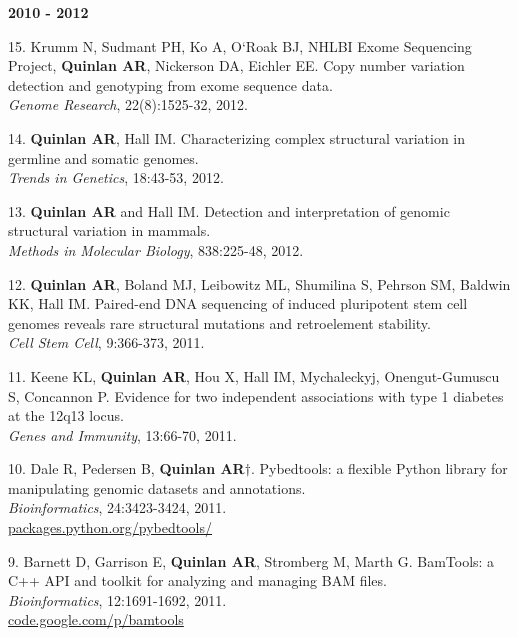 \documentclass[margin,line]{cv}
\begin{document}
\begin{resume}
\begin{list}{*}{}
    \end{list}

    \textbf{2010 - 2012} \\
    \begin{list}{*}{}

    \item[15.] Krumm N, Sudmant PH, Ko A, O`Roak BJ, NHLBI Exome Sequencing Project,
    \textbf{Quinlan AR}, Nickerson DA, Eichler EE.
    Copy number variation detection and genotyping from exome sequence data.\\
    \textit{Genome Research}, 22(8):1525-32, 2012.

    \item[14.] \textbf{Quinlan AR}, Hall IM.
    Characterizing complex structural variation in germline and somatic genomes.\\
    \textit{Trends in Genetics}, 18:43-53, 2012.

    \item[13.] \textbf{Quinlan AR} and Hall IM.
    Detection and interpretation of genomic structural variation in mammals.\\
    \textit{Methods in Molecular Biology}, 838:225-48, 2012.

    \item[12.] \textbf{Quinlan AR}, Boland MJ, Leibowitz ML, Shumilina S, Pehrson SM, Baldwin KK, Hall IM.
    Paired-end DNA sequencing of induced pluripotent stem cell genomes reveals
    rare structural mutations and retroelement stability.\\
    \textit{Cell Stem Cell}, 9:366-373, 2011.

    \item[11.] Keene KL, \textbf{Quinlan AR}, Hou X, Hall IM, Mychaleckyj, Onengut-Gumuscu S, Concannon P.
    Evidence for two independent associations with type 1 diabetes at the 12q13 locus.\\
    \textit{Genes and Immunity}, 13:66-70, 2011.

    \item[10.] Dale R, Pedersen B, \textbf{Quinlan AR}$\dagger$.
    Pybedtools: a flexible Python library for manipulating genomic datasets and annotations.\\
    \textit{Bioinformatics}, 24:3423-3424, 2011.\\
    \url{packages.python.org/pybedtools/}

    \item[9.] Barnett D, Garrison E, \textbf{Quinlan AR}, Stromberg M, Marth G.
    BamTools: a C++ API and toolkit for analyzing and managing BAM files.\\
    \textit{Bioinformatics}, 12:1691-1692, 2011.\\
    \url{code.google.com/p/bamtools}


\end{list}
\end{resume}
\end{document}
